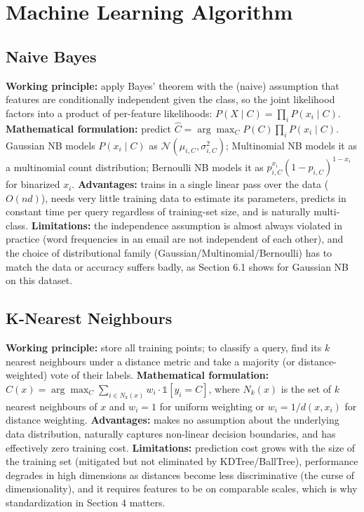 \documentclass[11pt,a4paper]{article}
\begin{document}
\section{Machine Learning Algorithm}

\subsection{Naive Bayes}
\textbf{Working principle:} apply Bayes' theorem with the (naive) assumption that features are conditionally independent given the class, so the joint likelihood factors into a product of per-feature likelihoods: $P(X\mid C) = \prod_i P(x_i \mid C)$.
\textbf{Mathematical formulation:} predict $\hat{C} = \arg\max_C P(C)\prod_i P(x_i\mid C)$. Gaussian NB models $P(x_i\mid C)$ as $\mathcal{N}(\mu_{i,C}, \sigma_{i,C}^2)$; Multinomial NB models it as a multinomial count distribution; Bernoulli NB models it as $p_{i,C}^{x_i}(1-p_{i,C})^{1-x_i}$ for binarized $x_i$.
\textbf{Advantages:} trains in a single linear pass over the data ($O(nd)$), needs very little training data to estimate its parameters, predicts in constant time per query regardless of training-set size, and is naturally multi-class.
\textbf{Limitations:} the independence assumption is almost always violated in practice (word frequencies in an email are not independent of each other), and the choice of distributional family (Gaussian/Multinomial/Bernoulli) has to match the data or accuracy suffers badly, as Section 6.1 shows for Gaussian NB on this dataset.

\subsection{K-Nearest Neighbours}
\textbf{Working principle:} store all training points; to classify a query, find its $k$ nearest neighbours under a distance metric and take a majority (or distance-weighted) vote of their labels.
\textbf{Mathematical formulation:} $\hat{C}(x) = \arg\max_C \sum_{i \in N_k(x)} w_i \cdot \mathbb{1}[y_i = C]$, where $N_k(x)$ is the set of $k$ nearest neighbours of $x$ and $w_i=1$ for uniform weighting or $w_i = 1/d(x,x_i)$ for distance weighting.
\textbf{Advantages:} makes no assumption about the underlying data distribution, naturally captures non-linear decision boundaries, and has effectively zero training cost.
\textbf{Limitations:} prediction cost grows with the size of the training set (mitigated but not eliminated by KDTree/BallTree), performance degrades in high dimensions as distances become less discriminative (the curse of dimensionality), and it requires features to be on comparable scales, which is why standardization in Section 4 matters.
\end{document}
